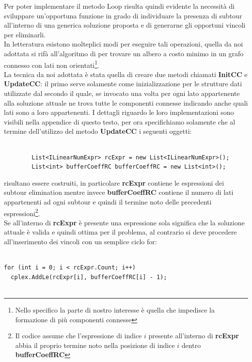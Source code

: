 \documentclass[11pt]{article}
\begin{document}
Per poter implementare il metodo Loop risulta quindi evidente la necessità di sviluppare un'opportuna funzione in grado di individuare la presenza di subtour all'interno di una generica soluzione proposta e di generarne gli opportuni vincoli per eliminarli.\\
In letteratura esistono molteplici modi per eseguire tali operazioni, quella da noi adottata si rifà all'algoritmo di  per trovare un albero a costo minimo in un grafo connesso con lati non orientati\footnote{Nello specifico la parte di nostro interesse è quella che impedisce la formazione di più componenti connesse}.\\
La tecnica da noi adottata è stata quella di creare due metodi chiamati \textbf{InitCC} e \textbf{UpdateCC}: il primo serve solamente come inizializzazione per le strutture dati utilizzate dal secondo il quale, se invocato una volta per ogni lato appartenente alla soluzione attuale ne trova tutte le componenti connesse indicando anche quali lati sono a loro appartenenti. I dettagli riguardo le loro implementazioni sono visibili nella appendice di questo testo, per ora specifichiamo solamente che al termine dell'utilizzo del metodo \textbf{UpdateCC} i seguenti oggetti:

\begin{lstlisting}

        List<ILinearNumExpr> rcExpr = new List<ILinearNumExpr>();
        List<int> bufferCoeffRC bufferCoeffRC = new List<int>();

\end{lstlisting}

risultano essere costruiti, in particolare \textbf{rcExpr} contiene le espressioni dei subtour elimination mentre invece \textbf{bufferCoeffRC} contiene il numero di lati appartenenti ad ogni subtour e quindi il termine noto delle precedenti espressioni\footnote{Il codice assume che l'espressione di indice $i$ presente all'interno di \textbf{rcExpr} abbia il proprio termine noto nella posizione di indice $i$ dentro \textbf{bufferCoeffRC}}.\\
Se all'interno di \textbf{rcExpr} è presente una espressione sola significa che la soluzione attuale è valida e quindi ottima per il problema, al contrario si deve procedere all'inserimento dei vincoli con un semplice ciclo for:

\begin{lstlisting}
                
for (int i = 0; i < rcExpr.Count; i++)
  cplex.AddLe(rcExpr[i], bufferCoeffRC[i] - 1);
              
\end{lstlisting}
\end{document}

